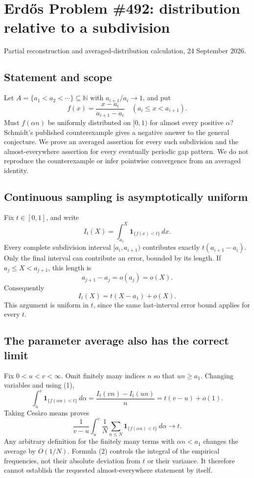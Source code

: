 \section{Erd\H{o}s Problem \#492: distribution relative to a subdivision}
\noindent Partial reconstruction and averaged-distribution calculation, 24 September 2026.

\subsection*{Statement and scope}
Let $A=\{a_1<a_2<\cdots\}\subseteq\mathbb N$ with $a_{i+1}/a_i\to1$, and put
\[f(x)=\frac{x-a_i}{a_{i+1}-a_i}\quad(a_i\le x<a_{i+1}).
\]
Must $f(\alpha n)$ be uniformly distributed on $[0,1)$ for almost every positive $\alpha$? Schmidt's published counterexample gives a negative answer to the general conjecture. We prove an averaged assertion for every such subdivision and the almost-everywhere assertion for every eventually periodic gap pattern. We do not reproduce the counterexample or infer pointwise convergence from an averaged identity.

\subsection*{Continuous sampling is asymptotically uniform}
Fix $t\in[0,1]$, and write
\[I_t(X)=\int_{a_1}^X\mathbf1_{\{f(x)<t\}}\,dx.
\]
Every complete subdivision interval $[a_i,a_{i+1})$ contributes exactly $t(a_{i+1}-a_i)$. Only the final interval can contribute an error, bounded by its length. If $a_j\le X<a_{j+1}$, this length is
\[a_{j+1}-a_j=o(a_j)=o(X).
\]
Consequently
\[I_t(X)=t(X-a_1)+o(X).\tag{1}\]
This argument is uniform in $t$, since the same last-interval error bound applies for every $t$.

\subsection*{The parameter average also has the correct limit}
Fix $0<u<v<\infty$. Omit finitely many indices $n$ so that $un\ge a_1$. Changing variables and using (1),
\[\int_u^v\mathbf1_{\{f(\alpha n)<t\}}\,d\alpha
=\frac{I_t(vn)-I_t(un)}n=t(v-u)+o(1).
\]
Taking Ces\`aro means proves
\[\frac1{v-u}\int_u^v\frac1N\sum_{n\le N}
\mathbf1_{\{f(\alpha n)<t\}}\,d\alpha\longrightarrow t.\tag{2}\]
Any arbitrary definition for the finitely many terms with $\alpha n<a_1$ changes the average by $O(1/N)$. Formula (2) controls the integral of the empirical frequencies, not their absolute deviation from $t$ or their variance. It therefore cannot establish the requested almost-everywhere statement by itself.

